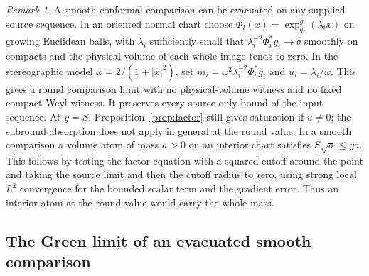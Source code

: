 \documentclass[11pt]{article}
\theoremstyle{definition}
\theoremstyle{remark}
\newtheorem{remark}[theorem]{Remark}
\begin{document}
\begin{remark}
A smooth conformal comparison can be evacuated on any supplied source sequence. In an oriented normal chart choose \(\Phi_i(x)=\exp^{g_i}_{q_i}(\lambda_i x)\) on growing Euclidean balls, with \(\lambda_i\) sufficiently small that \(\lambda_i^{-2}\Phi_i^*g_i\to\delta\) smoothly on compacts and the physical volume of each whole image tends to zero. In the stereographic model \(\omega=2/(1+|x|^2)\), set \(m_i=\omega^2\lambda_i^{-2}\Phi_i^*g_i\) and \(u_i=\lambda_i/\omega\). This gives a round comparison limit with no physical-volume witness and no fixed compact Weyl witness. It preserves every source-only bound of the input sequence. At \(y=S\), Proposition~\ref{prop:factor} still gives saturation if \(u\ne0\); the subround absorption does not apply in general at the round value. In a smooth comparison a volume atom of mass \(a>0\) on an interior chart satisfies \(S\sqrt a\le ya\). This follows by testing the factor equation with a squared cutoff around the point and taking the source limit and then the cutoff radius to zero, using strong local \(L^2\) convergence for the bounded scalar term and the gradient error. Thus an interior atom at the round value would carry the whole mass.
\end{remark}

\subsection{The Green limit of an evacuated smooth comparison}
\end{document}
